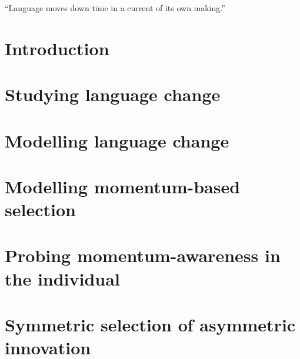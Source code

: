 \documentclass[twoside,10pt]{book}
\begin{document}
\tableofcontents

\listoffigures
\listoftables

\cleardoublepage
\thispagestyle{empty}
\vspace*{4cm}
\epigraph{``Language moves down time in a current of its own making.''}{\citep[p.160]{Sapir1921}}

\mainmatter

\chapter{Introduction}
\label{ch:intro}


\chapter{Studying language change}
\label{ch:review}


\chapter{Modelling language change}
\label{ch:modelling}


\chapter{Modelling momentum-based selection} %
\label{ch:momentummodel}


\chapter{Probing momentum-awareness in the individual}
\label{ch:questionnaire}


\chapter{Symmetric selection of asymmetric innovation}%
\label{ch:bigpicture}

\end{document}
